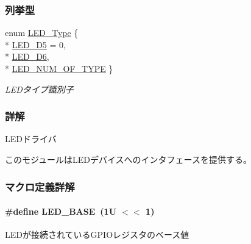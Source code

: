 \subsubsection*{列挙型}
\begin{DoxyCompactItemize}
\item 
enum \hyperlink{led_8h_a058b30c4dad8492729144d11afa6ddb1_a058b30c4dad8492729144d11afa6ddb1}{L\+E\+D\+\_\+\+Type} \{ \\*
\hyperlink{led_8h_a058b30c4dad8492729144d11afa6ddb1_a058b30c4dad8492729144d11afa6ddb1a376e447725418dcb340bfa577b884066}{L\+E\+D\+\_\+\+D5} = 0, 
\\*
\hyperlink{led_8h_a058b30c4dad8492729144d11afa6ddb1_a058b30c4dad8492729144d11afa6ddb1adf13aab65cdf330e59d514c0c1c28496}{L\+E\+D\+\_\+\+D6}, 
\\*
\hyperlink{led_8h_a058b30c4dad8492729144d11afa6ddb1_a058b30c4dad8492729144d11afa6ddb1a6c2579969e8acd0e164f7b6799a4f977}{L\+E\+D\+\_\+\+N\+U\+M\+\_\+\+O\+F\+\_\+\+T\+Y\+P\+E}
 \}\begin{DoxyCompactList}\small\item\em L\+E\+Dタイプ識別子 \end{DoxyCompactList}
\end{DoxyCompactItemize}


\subsubsection{詳解}
L\+E\+Dドライバ 

このモジュールは\+L\+E\+Dデバイスへのインタフェースを提供する。

 

\subsubsection{マクロ定義詳解}
\paragraph[{L\+E\+D\+\_\+\+B\+A\+S\+E}]{\setlength{\rightskip}{0pt plus 5cm}\#define L\+E\+D\+\_\+\+B\+A\+S\+E~(1\+U $<$$<$ 1)}\label{led_8h_ac2c029b1f7239de0df5bb5d18661d5d0_ac2c029b1f7239de0df5bb5d18661d5d0}


L\+E\+Dが接続されている\+G\+P\+I\+Oレジスタのベース値 



